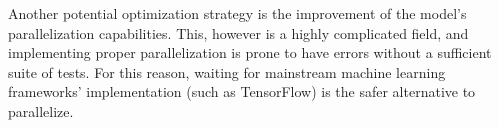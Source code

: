 \documentclass[journal]{IEEEtai}
\begin{document}
Another potential optimization strategy is the improvement of the model's parallelization capabilities. This, however is a highly complicated field, and implementing proper parallelization is prone to have errors without a sufficient suite of tests. For this reason, waiting for mainstream machine learning frameworks' implementation (such as TensorFlow\cite{tf}) is the safer alternative to parallelize.




\end{document}
